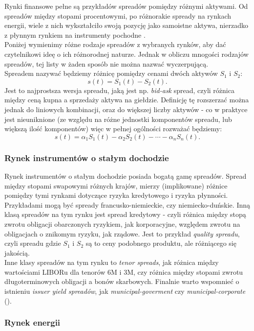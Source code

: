 Rynki finansowe pełne są przykładów spreadów pomiędzy różnymi aktywami. Od spreadów między stopami procentowymi, po różnorakie spready na rynkach energii, wiele z nich wykształciło swoją pozycję jako samoistne aktywa, nierzadko z płynnym rynkiem na instrumenty pochodne \cite{Carmona_Spread_Options}.\\
Poniżej wymienimy różne rodzaje spreadów z wybranych rynków, aby dać czytelnikowi ideę o ich różnorodnej naturze. Jednak w obliczu mnogości rodzajów spreadów, tej listy w żaden sposób nie można nazwać wyczerpującą.\\

Spreadem nazywać będziemy różnicę pomiędzy cenami dwóch aktywów $S_1$ i $S_2$:
$$ s(t) = S_1(t) - S_2(t).$$
Jest to najprostsza wersja spreadu, jaką jest np. \emph{bid-ask} spread, czyli różnica między ceną kupna a sprzedaży aktywa na giełdzie. Definicję tę rozszerzać można jednak do liniowych kombinacji, oraz do większej liczby aktywów - co w praktyce jest nieuniknione (ze względu na różne jednostki komponentów spreadu, lub większą ilość komponentów) więc w pełnej ogólności rozważać będziemy:
$$ s(t) = \alpha_1S_1(t) - \alpha_2S_2(t) - \cdots -\alpha_nS_n(t).$$

\subsubsection{Rynek instrumentów o stałym dochodzie}

Rynek instrumentów o stałym dochodzie posiada bogatą gamę spreadów. Spread między stopami swapowymi różnych krajów, mierzy (implikowane) różnice pomiędzy tymi rynkami dotyczące ryzyka kredytowego i ryzyka płynności. Przykładami mogą być spready francusko-niemieckie, czy niemiecko-duńskie. Inną klasą spreadów na tym rynku jest spread kredytowy - czyli różnica między stopą zwrotu obligacji obarczonych ryzykiem, jak korporacyjne, względem zwrotu na obligacjach o znikomym ryzyku, jak rządowe. Jest to przykład \emph{quality spreadu}, czyli spreadu gdzie $S_1$ i $S_2$ są to ceny podobnego produktu, ale różniącego się jakością.\\
Inne klasy spreadów na tym rynku to \emph{tenor spreads}, jak różnica między wartościami LIBORu dla tenorów 6M i 3M, czy różnica między stopami zwrotu długoterminowych obligacji a bonów skarbowych. Finalnie warto wspomnieć o istnieniu \emph{issuer yield spreadów}, jak \emph{municipal-goverment} czy \emph{municipal-corporate} (\cite{Fixed_Income}).


\subsubsection{Rynek energii}

